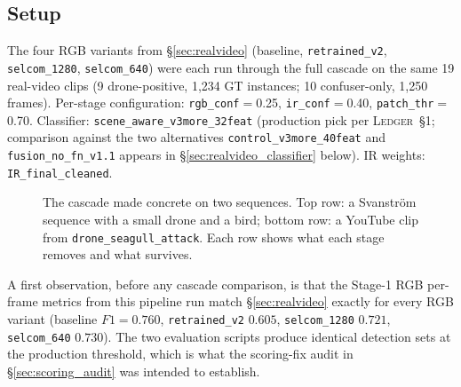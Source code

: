 \documentclass[12pt,a4paper,oneside,openright]{book}
\begin{document}
\subsection{Setup}
The four RGB variants from \S\ref{sec:realvideo} (baseline, \texttt{retrained\_v2}, \texttt{selcom\_1280}, \texttt{selcom\_640}) were each run through the full cascade on the same 19 real-video clips (9 drone-positive, 1{,}234 GT instances; 10 confuser-only, 1{,}250 frames). Per-stage configuration: \texttt{rgb\_conf}$=$0.25, \texttt{ir\_conf}$=$0.40, \texttt{patch\_thr}$=$0.70. Classifier: \texttt{scene\_aware\_v3more\_32feat} (production pick per \textsc{Ledger}~\S1; comparison against the two alternatives \texttt{control\_v3more\_40feat} and \texttt{fusion\_no\_fn\_v1.1} appears in \S\ref{sec:realvideo_classifier} below). IR weights: \texttt{IR\_final\_cleaned}.

\begin{figure}[htbp]
    \centering
    \caption{The cascade made concrete on two sequences. Top row: a Svanstr\"om sequence with a small drone and a bird; bottom row: a YouTube clip from \texttt{drone\_seagull\_attack}. Each row shows what each stage removes and what survives.}
    \label{fig:cascade_per_stage}
\end{figure}

A first observation, before any cascade comparison, is that the Stage-1 RGB per-frame metrics from this pipeline run match \S\ref{sec:realvideo} exactly for every RGB variant (baseline $F1=0.760$, \texttt{retrained\_v2} $0.605$, \texttt{selcom\_1280} $0.721$, \texttt{selcom\_640} $0.730$). The two evaluation scripts produce identical detection sets at the production threshold, which is what the scoring-fix audit in \S\ref{sec:scoring_audit} was intended to establish.
\end{document}
